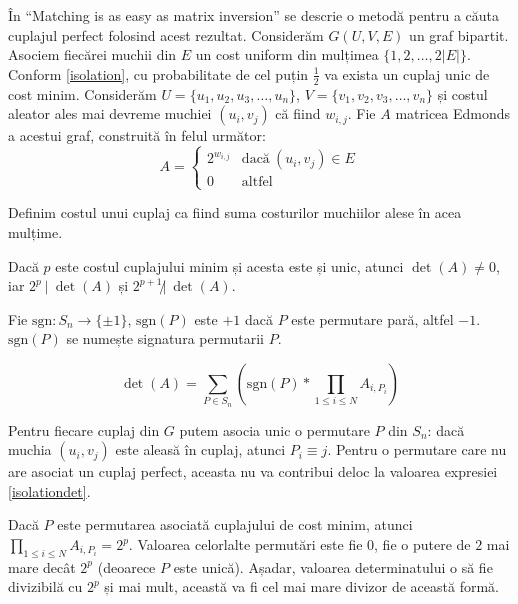 În ``Matching is as easy as matrix inversion'' \cite{matchingezmatrix} se
descrie o metodă pentru a căuta cuplajul perfect folosind acest rezultat.
Considerăm $G(U, V, E)$ un graf bipartit. Asociem fiecărei muchii din $E$ un
cost uniform din mulțimea $\{1, 2, \ldots, 2|E|\}$. Conform \ref{isolation}, cu
probabilitate de cel puțin $\frac{1}{2}$ va exista un cuplaj unic de cost minim.
Considerăm $U = \{u_{1}, u_{2}, u_{3}, \ldots, u_{n}\}$,
$V = \{v_{1}, v_{2}, v_{3}, \ldots, v_{n}\}$ și costul aleator ales mai devreme muchiei
$(u_{i}, v_{j})$ că fiind $w_{i,j}$. Fie $A$ matricea Edmonds a acestui
graf, construită în felul următor:
\begin{equation}
A=
\begin{cases}
  2^{w_{i,j}} & \text{dacă}\ (u_{i}, v_{j}) \in E \\
  0 & \text{altfel}
\end{cases}
\end{equation}

Definim costul unui cuplaj ca fiind suma costurilor muchiilor alese în acea mulțime.
\begin{lem}
  Dacă $p$ este costul cuplajului minim și acesta este și unic, atunci $\det(A) \neq 0$, iar
  $2^{p} \ |\ \det(A)$ și $2^{p+1} \not| \ \det(A)$.
\end{lem}

Fie $\text{sgn} : S_{n} \to \{\pm 1\}$, $\text{sgn}(P)$ este $+1$ dacă $P$
este permutare pară, altfel $-1$. $\text{sgn}(P)$ se numește signatura
permutarii $P$.

\begin{equation}
  \label{isolationdet}
  \det(A) = \displaystyle\sum\limits_{P \in S_{n}} (\text{sgn}(P) * \prod_{1 \leq i \leq N} A_{i, P_{i}})
\end{equation}

Pentru fiecare cuplaj din $G$ putem asocia unic o permutare $P$ din $S_{n}$:
dacă muchia $(u_{i}, v_{j})$ este aleasă în cuplaj, atunci $P_{i} \equiv j$.
Pentru o permutare care nu are asociat un cuplaj perfect, aceasta nu va
contribui deloc la valoarea expresiei \ref{isolationdet}. \par

Dacă $P$ este permutarea asociată cuplajului de cost minim, atunci
$\prod_{1 \leq i \leq N} A_{i, P_{i}} = 2^{p}$. Valoarea celorlalte permutări
este fie $0$, fie o putere de $2$ mai mare decât $2^{p}$ (deoarece $P$ este
unică). Așadar, valoarea determinatului o să fie divizibilă cu $2^{p}$ și
mai mult, această va fi cel mai mare divizor de această formă.

